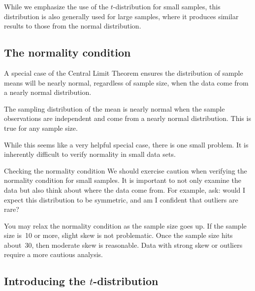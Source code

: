 While we emphasize the use of the $t$-distribution for small samples, this distribution is also generally used for large samples, where it produces similar results to those from the normal distribution.


\subsection{The normality condition}
\label{normalityCond}

A special case of the Central Limit Theorem ensures the distribution of sample means will be nearly normal, regardless of sample size, when the data come from a nearly normal distribution.

\begin{termBox}{
The sampling distribution of the mean is nearly normal when the sample observations are independent and come from a nearly normal distribution. This is true for any sample size.
}
\end{termBox}

While this seems like a very helpful special case, there is one small problem. It is inherently difficult to verify normality in small data sets.

\begin{caution}
{Checking the normality condition}
{We should exercise caution when verifying the normality condition for small samples. It is important to not only examine the data but also think about where the data come from. For example, ask: would I expect this distribution to be symmetric, and am I confident that outliers are rare?}
\end{caution}

You may relax the normality condition as the sample size goes up. If the sample size is~10 or more, slight skew is not problematic. Once the sample size hits about~30, then moderate skew is reasonable. Data with strong skew or outliers require a more cautious analysis.


\subsection{Introducing the $t$-distribution}
\label{introducingTheTDistribution}


